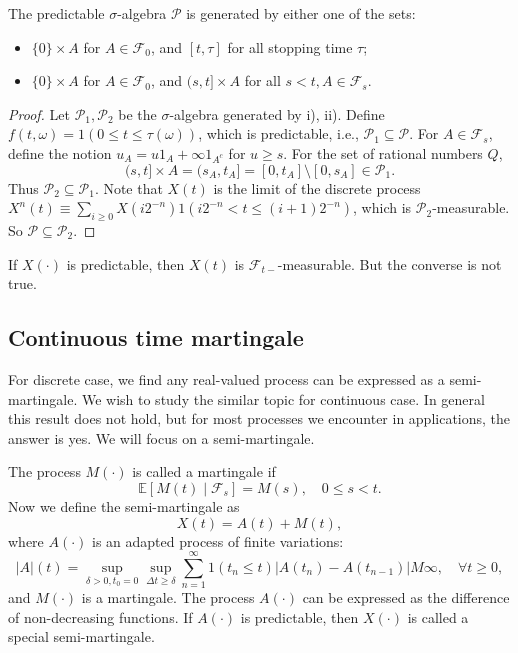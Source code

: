 \begin{proposition}
The predictable $\sigma$-algebra $\mathcal{P}$ is generated by either one of the sets:
\begin{itemize}
\item
$\{0\}\times A$ for $A\in\mathcal{F}_0$, and $[t,\tau]$ for all stopping time $\tau$;
\item
$\{0\}\times A$ for $A\in\mathcal{F}_0$, and $(s,t]\times A$ for all $s<t, A\in\mathcal{F}_s$.
\end{itemize}
\end{proposition}

\begin{proof}
Let $\mathcal{P}_1,\mathcal{P}_2$ be the $\sigma$-algebra generated by i), ii).
Define $f(t,\omega)=1(0\le t\le \tau(\omega))$, which is predictable, i.e., $\mathcal{P}_1\subseteq\mathcal{P}$.
For $A\in\mathcal{F}_s$, define the notion $u_A=u1_A+\infty1_{A^c}$ for $u\ge s$.
For the set of rational numbers $Q$,
\[
(s,t]\times A=(s_A,t_A]=[0,t_A]\setminus[0,s_A]\in\mathcal{P}_1.
\]
Thus $\mathcal{P}_2\subseteq\mathcal{P}_1$.
Note that $X(t)$ is the limit of the discrete process $X^n(t)\equiv\sum_{i\ge0}X(i2^{-n})1(i2^{-n}<t\le (i+1)2^{-n})$, which is $\mathcal{P}_2$-measurable. So $\mathcal{P}\subseteq\mathcal{P}_2$.


\end{proof}

\begin{remark}
If $X(\cdot)$ is predictable, then $X(t)$ is $\mathcal{F}_{t-}$-measurable. But the converse is not true.
\end{remark}

\subsection{Continuous time martingale}
For discrete case, we find any real-valued process can be expressed as a semi-martingale.
We wish to study the similar topic for continuous case.
In general this result does not hold, but for most processes we encounter in applications, the answer is yes.
We will focus on a semi-martingale.

\begin{definition}[Martingale]
The process $M(\cdot)$ is called a martingale if
\[
\mathbb{E}[M(t)\mid\mathcal{F}_s]=M(s),\quad 0\le s<t.
\]
Now we define the semi-martingale as
\[
X(t)=A(t)+M(t),
\]
where $A(\cdot)$ is an adapted process of finite variations:
\[
|A|(t)=\sup_{\delta>0, t_0=0}\sup_{\Delta t\ge\delta}\sum_{n=1}^\infty1(t_n\le t)|A(t_n) - A(t_{n-1})|M\infty,\quad\forall t\ge0,
\]
and $M(\cdot)$ is a martingale.
The process $A(\cdot)$ can be expressed as the difference of non-decreasing functions.
If $A(\cdot)$ is predictable, then $X(\cdot)$ is called a special semi-martingale.
\end{definition}

